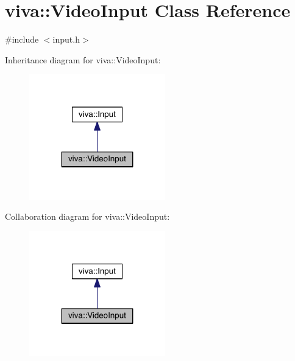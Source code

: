 \hypertarget{classviva_1_1_video_input}{}\section{viva\+:\+:Video\+Input Class Reference}
\label{classviva_1_1_video_input}


{\ttfamily \#include $<$input.\+h$>$}



Inheritance diagram for viva\+:\+:Video\+Input\+:
\nopagebreak
\begin{figure}[H]
\begin{center}
\leavevmode
\includegraphics[width=167pt]{classviva_1_1_video_input__inherit__graph}
\end{center}
\end{figure}


Collaboration diagram for viva\+:\+:Video\+Input\+:
\nopagebreak
\begin{figure}[H]
\begin{center}
\leavevmode
\includegraphics[width=167pt]{classviva_1_1_video_input__coll__graph}
\end{center}
\end{figure}
